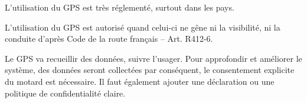 L'utilisation du GPS est très réglementé, surtout dans les pays. 

L'utilisation du GPS est autorisé quand celui-ci ne gêne ni la visibilité, ni la conduite d'après Code de la route français – Art. R412-6\cite{loi_code_de_la_route}.

Le GPS va recueillir des données, suivre l'usager. Pour approfondir et améliorer le système, des données seront collectées par conséquent, le consentement explicite du motard est nécessaire. Il faut également ajouter une déclaration ou une politique de confidentialité claire.



